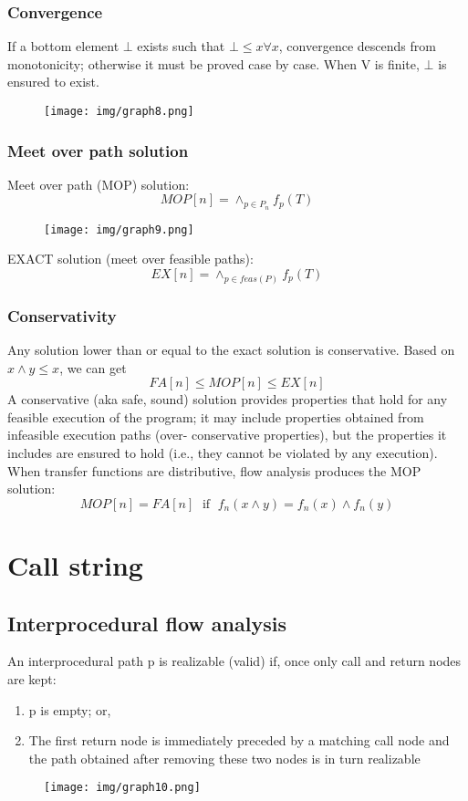 \documentclass[a4paper, 10pt, titlepage]{article}
\begin{document}
\subsubsection{Convergence}
If a bottom element $\bot$ exists such that $\bot \leq x \forall x$, convergence
descends from monotonicity; otherwise it must be proved case
by case. When V is finite, $\bot$ is ensured to exist.
\begin{figure}[h]
\centering
\texttt{[image: img/graph8.png]}
\end{figure}

\subsubsection{Meet over path solution}
Meet over path (MOP) solution:
$$MOP[n] = \wedge_{p \in P_n} f_p(T)$$
\begin{figure}[h]
\centering
\texttt{[image: img/graph9.png]}
\end{figure}
EXACT solution (meet over feasible paths):
$$EX[n]=\wedge_{p \in feas(P)} f_p(T)$$

\subsubsection{Conservativity}
Any solution lower than or equal to the exact solution is conservative. Based on $x \wedge y \leq x$, we can get
$$FA[n] \leq MOP[n] \leq EX[n]$$
A conservative (aka safe, sound) solution provides properties that hold for any feasible execution of the program; it may include properties obtained from infeasible execution paths (over- conservative properties), but the properties it includes are ensured to hold (i.e., they cannot be violated by any execution). When transfer functions are distributive, flow analysis produces the MOP solution:
$$MOP[n] = FA[n] \;\text{ if }\; f_n(x \wedge y) = f_n(x) \wedge f_n(y)$$

\newpage
\section{Call string}
\subsection{Interprocedural flow analysis}
An interprocedural path p is realizable (valid) if, once only call and return nodes are kept:
\begin{enumerate}
\item p is empty; or,
\item The first return node is immediately preceded by a matching call node and the path obtained after removing these two nodes is in turn realizable
\end{enumerate}
\begin{figure}[h]
\centering
\texttt{[image: img/graph10.png]}
\end{figure}
\end{document}
